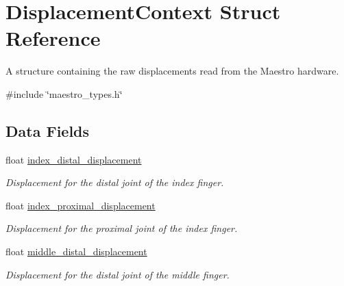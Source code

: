 \hypertarget{struct_displacement_context}{}\section{Displacement\+Context Struct Reference}
\label{struct_displacement_context}


A structure containing the raw displacements read from the Maestro hardware.  




{\ttfamily \#include \char`\"{}maestro\+\_\+types.\+h\char`\"{}}

\subsection*{Data Fields}
\begin{DoxyCompactItemize}
\item 
\mbox{\label{struct_displacement_context_a5591c4a9fdbe950d4807ddaa238092ba}} 
float \hyperlink{struct_displacement_context_a5591c4a9fdbe950d4807ddaa238092ba}{index\+\_\+distal\+\_\+displacement}
\begin{DoxyCompactList}\small\item\em Displacement for the distal joint of the index finger. \end{DoxyCompactList}\item 
\mbox{\label{struct_displacement_context_af3083c1881d82ac3ef96443c1a7c1dc6}} 
float \hyperlink{struct_displacement_context_af3083c1881d82ac3ef96443c1a7c1dc6}{index\+\_\+proximal\+\_\+displacement}
\begin{DoxyCompactList}\small\item\em Displacement for the proximal joint of the index finger. \end{DoxyCompactList}\item 
\mbox{\label{struct_displacement_context_a548871086b83358625b774cf6b1fdd07}} 
float \hyperlink{struct_displacement_context_a548871086b83358625b774cf6b1fdd07}{middle\+\_\+distal\+\_\+displacement}
\begin{DoxyCompactList}\small\item\em Displacement for the distal joint of the middle finger. \end{DoxyCompactList}\item 

\end{DoxyCompactItemize}
